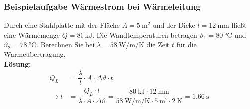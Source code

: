 \documentclass{beamer}
\begin{document}
\frame
{
\frametitle{Beispielaufgabe Wärmestrom bei Wärmeleitung}
Durch eine Stahlplatte mit der Fläche $A=\SI{5}{\square\meter}$ und der Dicke $l=\SI{12}{\milli\meter}$ fließt eine Wärmemenge $Q=\SI{80}{\kilo\joule}$. Die Wandtemperaturen betragen $\vartheta_{1}=\SI{80}{\celsius}$ und $\vartheta_{2}=\SI{78}{\celsius}$. Berechnen Sie bei $\lambda=\SI{58}{\watt\per\meter\per\kelvin}$ die Zeit $t$ für die Wärmeübertragung.\\
\textbf{Lösung:}
\begin{align*}
Q_L&=\dfrac{\lambda}{l}\cdot A\cdot\Delta\vartheta\cdot t\\
\rightarrow t&=\dfrac{Q_L\cdot l}{\lambda\cdot A\cdot\Delta\vartheta}=\dfrac{\SI{80}{\kilo\joule}\cdot\SI{12}{\milli\meter}}{\SI{58}{\watt\per\meter\per\kelvin}\cdot \SI{5}{\square\meter}\cdot\SI{2}{\kelvin}}=\SI{1,66}{\second}
\end{align*}
}
\end{document}
